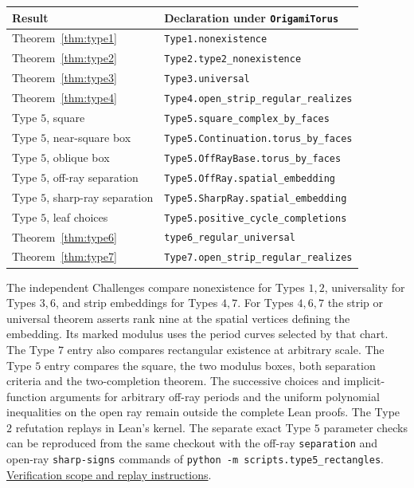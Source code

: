 \documentclass[11pt,letterpaper]{amsart}
\newcommand{\release}{bd3a0e03908481d738df30233cf95c641a1d3f71}
\newcommand{\reporef}[2]{\href{https://github.com/vltanh/lean4-origami-torus/blob/\release/#1}{#2}}
\begin{document}
\begin{center}
\small
\begin{tabularx}{\linewidth}{@{}lX@{}}
\toprule
Result & Declaration under \texttt{OrigamiTorus}\\
\midrule
Theorem~\ref{thm:type1}&\texttt{Type1.nonexistence}\\
Theorem~\ref{thm:type2}&\texttt{Type2.type2\_nonexistence}\\
Theorem~\ref{thm:type3}&\texttt{Type3.universal}\\
Theorem~\ref{thm:type4}&\texttt{Type4.open\_strip\_regular\_realizes}\\
Type \(5\), square&\texttt{Type5.square\_complex\_by\_faces}\\
Type \(5\), near-square box&\texttt{Type5.Continuation.torus\_by\_faces}\\
Type \(5\), oblique box&\texttt{Type5.OffRayBase.torus\_by\_faces}\\
Type \(5\), off-ray separation&\texttt{Type5.OffRay.spatial\_embedding}\\
Type \(5\), sharp-ray separation&\texttt{Type5.SharpRay.spatial\_embedding}\\
Type \(5\), leaf choices&\texttt{Type5.positive\_cycle\_completions}\\
Theorem~\ref{thm:type6}&\texttt{type6\_regular\_universal}\\
Theorem~\ref{thm:type7}&\texttt{Type7.open\_strip\_regular\_realizes}\\
\bottomrule
\end{tabularx}
\end{center}
The independent Challenges compare nonexistence for Types \(1,2\),
universality for Types \(3,6\), and strip embeddings for Types
\(4,7\). For Types \(4,6,7\) the strip or universal theorem asserts rank nine at the spatial vertices
defining the embedding. Its marked modulus uses the period curves
selected by that chart. The Type \(7\) entry
also compares rectangular existence at arbitrary scale. The Type \(5\)
entry compares the square, the two modulus boxes, both separation
criteria and the two-completion theorem.
The successive choices and implicit-function arguments for arbitrary
off-ray periods and the uniform polynomial inequalities on the open
ray remain outside the complete Lean proofs.
The Type \(2\) refutation replays in Lean's kernel. The separate exact
Type \(5\) parameter checks can be reproduced from the same checkout
with the off-ray \texttt{separation} and open-ray \texttt{sharp-signs}
commands of \texttt{python -m scripts.type5\_rectangles}.
\reporef{docs/VERIFICATION.md}{Verification scope and replay instructions}.
\end{document}
